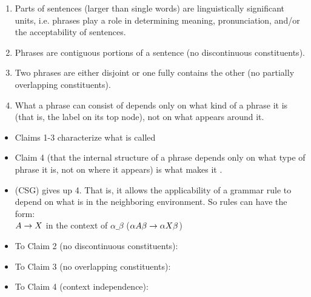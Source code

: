 \documentclass[a4paper,landscape,headrule,footrule]{foils}
\begin{document}
\begin{enumerate}
\item  Parts of sentences (larger than single words) are
linguistically significant units, i.e. phrases play a role in
determining meaning, pronunciation, and/or the
acceptability of sentences.
\item Phrases are contiguous portions of a sentence (no
discontinuous constituents).
\item Two phrases are either disjoint or one fully contains the
other (no partially overlapping constituents).
\item What a phrase can consist of depends only on what kind of
a phrase it is (that is, the label on its top node), not on what
appears around it.
\end{enumerate}

\newpage
\begin{itemize}
\item Claims 1-3 characterize what is called 

\item Claim 4 (that the internal structure of a phrase depends only on what type of phrase it is, not on where it appears) is what makes it .

\item {} (CSG) gives up 4. 
That is, it allows the applicability of a
grammar rule to depend on what is in the
neighboring environment. So rules can have the
form: 
\\ $A \rightarrow X$ in the context of $\alpha \_\beta$ ($\alpha A\beta \rightarrow \alpha X\beta$)
\end{itemize}

\begin{itemize}
\item To Claim 2 (no discontinuous constituents):
\\ 

\item To Claim 3 (no overlapping constituents):
\\ 

\item To Claim 4 (context independence):
  \begin{exe}
  \ex {}
  \ex {}
  \ex {}
  \ex {}
  \end{exe}
\end{itemize}
\end{document}
